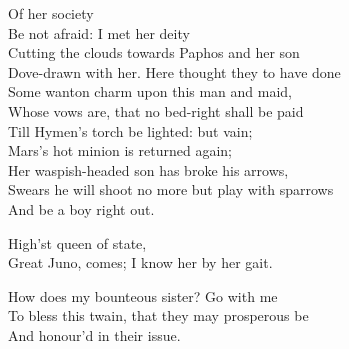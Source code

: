 \begin{verse_speech}[Iris] 
Of her society\\
Be not afraid: I met her deity\\
Cutting the clouds towards Paphos and her son\\
Dove-drawn with her. Here thought they to have done\\
Some wanton charm upon this man and maid,\\
Whose vows are, that no bed-right shall be paid\\
Till Hymen's torch be lighted: but vain;\\
Mars's hot minion is returned again;\\
Her waspish-headed son has broke his arrows,\\
Swears he will shoot no more but play with sparrows\\
And be a boy right out.
\end{verse_speech}


\begin{verse_speech}[Ceres] 
High'st queen of state,\\
Great Juno, comes; I know her by her gait.
\end{verse_speech}


\begin{verse_speech}[Juno] 
How does my bounteous sister? Go with me\\
To bless this twain, that they may prosperous be\\
And honour'd in their issue.
\end{verse_speech}


\begin{verse_speech}[Juno]
	\begin{song}
\end{song}
\end{verse_speech}

\begin{verse_speech}[Ceres] 
	\begin{song}
\end{song}
\end{verse_speech}






